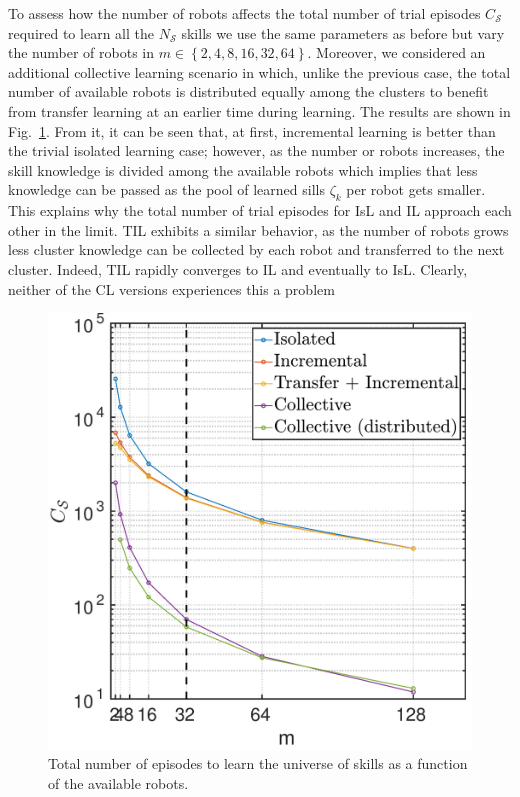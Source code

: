 To assess how the number of robots affects the total number of trial episodes $C_\mathcal{S}$ required to learn all the $N_\mathcal{S}$ skills we use the same parameters as before but vary the number of robots in $m \in \left \lbrace 2,4,8,16,32,64\right \rbrace$. Moreover, we considered an additional collective learning scenario in which, unlike the previous case, the total number of available robots is distributed equally among the clusters to benefit from transfer learning at an earlier time during learning. The results are shown in Fig.~\ref{fig:total_episodes_per_n_robots}. From it, it can be seen that, at first, incremental learning is better than the trivial isolated learning case; however, as the number or robots increases, the skill knowledge is divided among the available robots which implies that less knowledge can be passed as the pool of learned sills $\zeta_k$ per robot gets smaller. This explains why the total number of trial episodes for IsL and IL approach each other in the limit. TIL exhibits a similar behavior, as the number of robots grows less cluster knowledge can be collected by each robot and transferred to the next cluster. Indeed, TIL rapidly converges to IL and eventually to IsL. Clearly, neither of the CL versions experiences this a problem
\begin{figure}[!th]
	\centering
	\includegraphics[width=0.9\columnwidth]{fig/total_episodes_per_n_robots.pdf}
	\caption{Total number of episodes to learn the universe of skills as a function of the available robots.}
	\label{fig:total_episodes_per_n_robots}
\end{figure}




